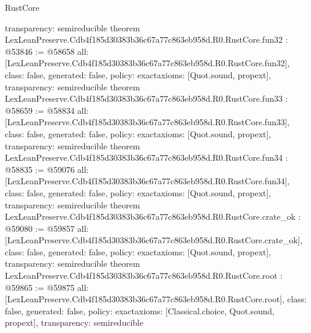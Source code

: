 \begin{lexlean}{RustCore}
\begin{coremodule}
{  transparency: semireducible
}
theorem LexLeanPreserve.Cdb4f185d30383b36c67a77c863eb958d.R0.RustCore.fun32 : @53846 := @58658 {
  all: [LexLeanPreserve.Cdb4f185d30383b36c67a77c863eb958d.R0.RustCore.fun32],
  class: false,
  generated: false,
  policy: exact{axioms: [Quot.sound, propext]},
  transparency: semireducible
}
theorem LexLeanPreserve.Cdb4f185d30383b36c67a77c863eb958d.R0.RustCore.fun33 : @58659 := @58834 {
  all: [LexLeanPreserve.Cdb4f185d30383b36c67a77c863eb958d.R0.RustCore.fun33],
  class: false,
  generated: false,
  policy: exact{axioms: [Quot.sound, propext]},
  transparency: semireducible
}
theorem LexLeanPreserve.Cdb4f185d30383b36c67a77c863eb958d.R0.RustCore.fun34 : @58835 := @59076 {
  all: [LexLeanPreserve.Cdb4f185d30383b36c67a77c863eb958d.R0.RustCore.fun34],
  class: false,
  generated: false,
  policy: exact{axioms: [Quot.sound, propext]},
  transparency: semireducible
}
theorem LexLeanPreserve.Cdb4f185d30383b36c67a77c863eb958d.R0.RustCore.crate_ok : @59080 := @59857 {
  all: [LexLeanPreserve.Cdb4f185d30383b36c67a77c863eb958d.R0.RustCore.crate_ok],
  class: false,
  generated: false,
  policy: exact{axioms: [Quot.sound, propext]},
  transparency: semireducible
}
theorem LexLeanPreserve.Cdb4f185d30383b36c67a77c863eb958d.R0.RustCore.root : @59865 := @59875 {
  all: [LexLeanPreserve.Cdb4f185d30383b36c67a77c863eb958d.R0.RustCore.root],
  class: false,
  generated: false,
  policy: exact{axioms: [Classical.choice, Quot.sound, propext]},
  transparency: semireducible
}


\end{coremodule}
\end{lexlean}
